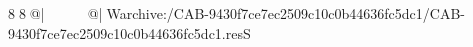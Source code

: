 8  8  @|                                                   @| W   archive:/CAB-9430f7ce7ec2509c10c0b44636fc5dc1/CAB-9430f7ce7ec2509c10c0b44636fc5dc1.resS 
